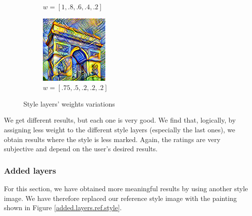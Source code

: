 \documentclass[twocolumn,superscriptaddress,aps, floatfix]{revtex4-1}
\begin{document}
\begin{figure}[ht]
\begin{subfigure}[b]{0.13\textwidth}
            \caption{$w = [1, .8, .6, .4, .2]$}
        \end{subfigure}
        \hfill
        \begin{subfigure}[b]{0.13\textwidth}
            \centering
            \includegraphics[width=\textwidth]{resources/png/weights/sun-trees-paris-high-decreasing-weights.png}
            \caption{$w = [.75, .5, .2, .2, .2]$}
        \end{subfigure}
        \caption{Style layers' weights variations}
        \label{fig:weights.style.layers}
    \end{figure}
    
    We get different results, but each one is very good. We find that, logically, by assigning less weight to the different style layers (especially the last ones), we obtain results where the style is less marked. Again, the ratings are very subjective and depend on the user's desired results.
    
    \subsubsection{Added layers}
    
    For this section, we have obtained more meaningful results by using another style image. We have therefore replaced our reference style image with the painting shown in Figure \ref{added.layers.ref.style}.
    
\end{document}
